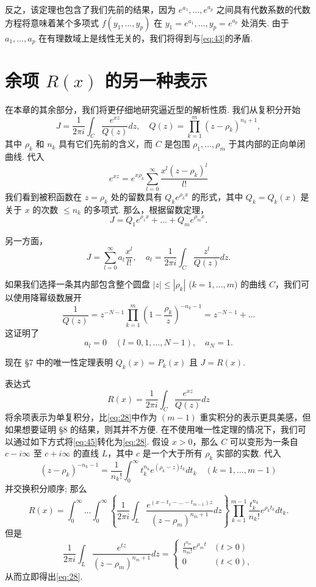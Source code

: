反之，该定理也包含了我们先前的结果，因为 $e^{a_1}, \dots, e^{a_p}$ 之间具有代数系数的代数方程将意味着某个多项式 $f(y_1, \dots, y_p)$ 在 $y_1 = e^{a_1}, \dots, y_p = e^{a_p}$ 处消失. 由于 $a_1, \dots, a_p$ 在有理数域上是线性无关的，我们将得到与\eqref{eq:43}的矛盾.

\section{余项 $R(x)$ 的另一种表示}

在本章的其余部分，我们将更仔细地研究逼近型的解析性质. 我们从复积分开始
\begin{equation} J = \frac{1}{2\pi i} \int_C \frac{e^{xz}}{Q(z)} dz, \quad Q(z) = \prod_{k=1}^{m} (z - \rho_k)^{n_k+1}, \tag{44}\label{eq:44} \end{equation}
其中 $\rho_k$ 和 $n_k$ 具有它们先前的含义，而 $C$ 是包围 $\rho_1, \ldots, \rho_m$ 于其内部的正向单闭曲线. 代入
\[ e^{xz} = e^{x\rho_k} \sum_{l=0}^{\infty} \frac{x^l (z-\rho_k)^l}{l!} \]
我们看到被积函数在 $z=\rho_k$ 处的留数具有 $Q_k e^{\rho_k x}$ 的形式，其中 $Q_k=Q_k(x)$ 是关于 $x$ 的次数 $\leq n_k$ 的多项式. 那么，根据留数定理，
\[ J = Q_1 e^{\rho_1 x} + \dots + Q_m e^{\rho_m x}. \]

另一方面，
\[ J = \sum_{l=0}^{\infty} a_l \frac{x^l}{l!}, \quad a_l = \frac{1}{2\pi i} \int_C \frac{z^l}{Q(z)} dz. \]

如果我们选择一条其内部包含整个圆盘 $|z| \leq |\rho_k|$ ($k=1,\dots,m$) 的曲线 $C$，我们可以使用降幂级数展开
\[ \frac{1}{Q(z)} = z^{-N-1} \prod_{k=1}^{m} \left(1 - \frac{\rho_k}{z}\right)^{-n_k-1} = z^{-N-1} + \dots \]
这证明了
\[ a_l = 0 \quad (l=0,1,\dots,N-1), \quad a_N = 1. \]

现在 \S 7 中的唯一性定理表明 $Q_k(x) = P_k(x)$ 且 $J = R(x)$.

表达式
\begin{equation} R(x) = \frac{1}{2\pi i} \int_C \frac{e^{xz}}{Q(z)} dz \tag{45}\label{eq:45} \end{equation}
将余项表示为单复积分，比\eqref{eq:28}中作为 $(m-1)$ 重实积分的表示更具美感，但如果想要证明 \S 8 的结果，则其并不方便. 在不使用唯一性定理的情况下，我们可以通过如下方式将\eqref{eq:45}转化为\eqref{eq:28}. 假设 $x>0$，那么 $C$ 可以变形为一条自 $c-i\infty$ 至 $c+i\infty$ 的直线 $L$，其中 $c$ 是一个大于所有 $\rho_k$ 实部的实数. 代入
\[ (z-\rho_k)^{-n_k-1} = \frac{1}{n_k!} \int_0^\infty t_k^{n_k} e^{(\rho_k-z)t_k} dt_k \quad (k=1,\dots,m-1) \]
并交换积分顺序; 那么
\[ R(x) = \int_0^{\infty} \dots \int_0^{\infty} \left\{ \frac{1}{2\pi i} \int_L \frac{e^{(x-t_1-\dots-t_{m-1})z}}{(z-\rho_m)^{n_m+1}} dz \right\} \prod_{k=1}^{m-1} \frac{t_k^{n_k}}{n_k!} e^{\rho_k t_k} dt_k. \]
但是
\[ \frac{1}{2\pi i} \int_L \frac{e^{tz}}{(z-\rho_m)^{n_m+1}} dz = \begin{cases} \frac{t^{n_m}}{n_m!} e^{\rho_m t} & (t>0) \\ 0 & (t<0), \end{cases} \]
从而立即得出\eqref{eq:28}.

